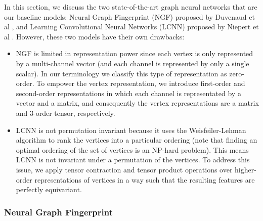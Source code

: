 \documentclass[a4paper]{article}
\begin{document}
In this section, we discuss the two state-of-the-art graph neural networks that are our baseline models: Neural Graph Fingerprint (NGF) proposed by Duvenaud et al \cite{Duvenaud}, and Learning Convolutional Neural Networks (LCNN) proposed by Niepert et al \cite{Niepert}. However, these two models have their own drawbacks:
\begin{itemize}
	\item NGF is limited in representation power since each vertex is only represented by a multi-channel vector (and each channel is represented by only a single scalar). In our terminology we classify this type of representation as zero-order. To empower the vertex representation, we introduce first-order and second-order representations in which each channel is representated by a vector and a matrix, and consequently the vertex representations are a matrix and 3-order tensor, respectively.
	\item LCNN is not permutation invariant because it uses the Weisfeiler-Lehman algorithm to rank the vertices into a particular ordering (note that finding an optimal ordering of the set of vertices is an NP-hard problem). This means LCNN is not invariant under a permutation of the vertices. To address this issue, we apply tensor contraction and tensor product operations over higher-order representations of vertices in a way such that the resulting features are perfectly equivariant.
\end{itemize}

\subsubsection{Neural Graph Fingerprint \cite{Duvenaud}}
\end{document}
